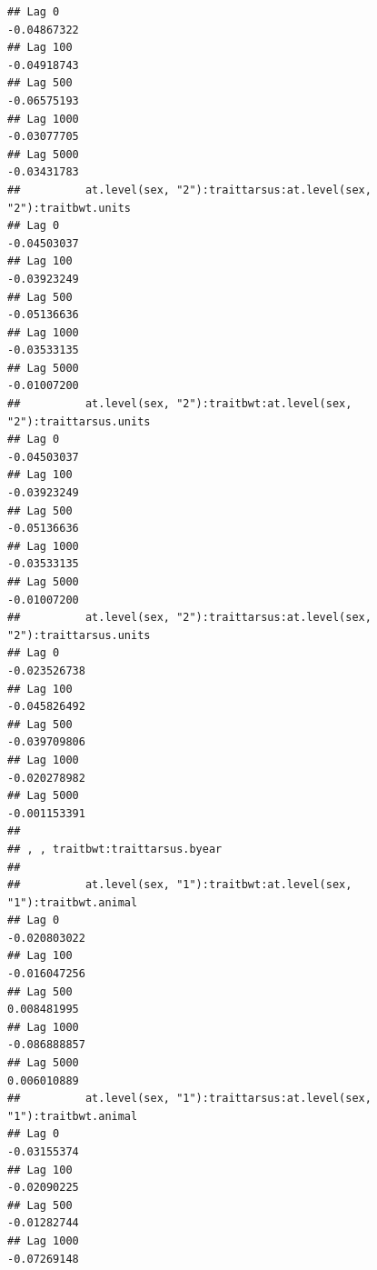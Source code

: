 \documentclass[
  12pt,
]{book}
\begin{document}
\begin{verbatim}
## Lag 0                                                      -0.04867322
## Lag 100                                                    -0.04918743
## Lag 500                                                    -0.06575193
## Lag 1000                                                   -0.03077705
## Lag 5000                                                   -0.03431783
##          at.level(sex, "2"):traittarsus:at.level(sex, "2"):traitbwt.units
## Lag 0                                                         -0.04503037
## Lag 100                                                       -0.03923249
## Lag 500                                                       -0.05136636
## Lag 1000                                                      -0.03533135
## Lag 5000                                                      -0.01007200
##          at.level(sex, "2"):traitbwt:at.level(sex, "2"):traittarsus.units
## Lag 0                                                         -0.04503037
## Lag 100                                                       -0.03923249
## Lag 500                                                       -0.05136636
## Lag 1000                                                      -0.03533135
## Lag 5000                                                      -0.01007200
##          at.level(sex, "2"):traittarsus:at.level(sex, "2"):traittarsus.units
## Lag 0                                                           -0.023526738
## Lag 100                                                         -0.045826492
## Lag 500                                                         -0.039709806
## Lag 1000                                                        -0.020278982
## Lag 5000                                                        -0.001153391
## 
## , , traitbwt:traittarsus.byear
## 
##          at.level(sex, "1"):traitbwt:at.level(sex, "1"):traitbwt.animal
## Lag 0                                                      -0.020803022
## Lag 100                                                    -0.016047256
## Lag 500                                                     0.008481995
## Lag 1000                                                   -0.086888857
## Lag 5000                                                    0.006010889
##          at.level(sex, "1"):traittarsus:at.level(sex, "1"):traitbwt.animal
## Lag 0                                                          -0.03155374
## Lag 100                                                        -0.02090225
## Lag 500                                                        -0.01282744
## Lag 1000                                                       -0.07269148

\end{verbatim}
\end{document}
